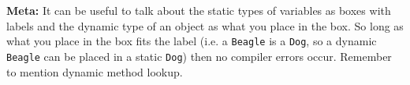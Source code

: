 \begin{solution}
\textbf{Meta:} It can be useful to talk about the static types of variables as
boxes with labels and the dynamic type of an object as what you place in the
box. So long as what you place in the box fits the label (i.e. a
\lstinline$Beagle$ is a \lstinline$Dog$, so a dynamic \lstinline$Beagle$ can be
placed in a static \lstinline$Dog$) then no compiler errors occur. Remember to
mention dynamic method lookup.
\end{solution}
